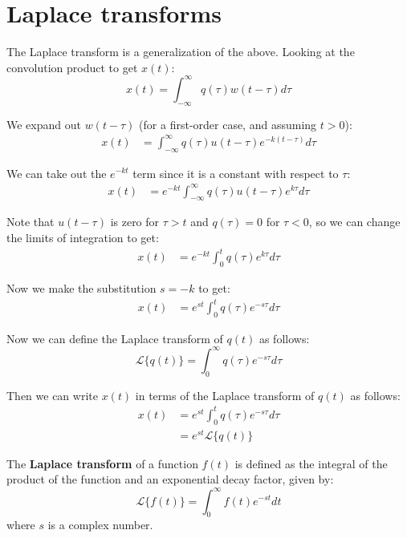 \section{Laplace transforms}
The Laplace transform is a generalization of the above. Looking at the convolution product to get $x(t)$:
\begin{equation*}
x(t) = \int_{-\infty}^{\infty} q(\tau) w(t - \tau) d\tau
\end{equation*}

We expand out $w(t - \tau)$ (for a first-order case, and assuming $t > 0$):
\begin{align*}
x(t) &= \int_{-\infty}^{\infty} q(\tau) u(t - \tau) e^{-k(t - \tau)} d\tau 
\end{align*}

We can take out the $e^{-kt}$ term since it is a constant with respect to $\tau$:
\begin{align*}
x(t) &= e^{-kt} \int_{-\infty}^{\infty} q(\tau) u(t - \tau) e^{k\tau} d\tau
\end{align*}

Note that $u(t - \tau)$ is zero for $\tau > t$ and $q(\tau) = 0$ for $\tau < 0$, so we can change the limits of integration to get:
\begin{align*}
x(t) &= e^{-kt} \int_{0}^{t} q(\tau) e^{k\tau} d\tau
\end{align*}

Now we make the substitution $s = -k$ to get:
\begin{align*}
x(t) &= e^{st} \int_{0}^{t} q(\tau) e^{-s\tau} d\tau
\end{align*}

Now we can define the Laplace transform of $q(t)$ as follows:
\begin{equation*}
\boxed{
\mathcal{L}\{q(t)\} = \int_{0}^{\infty} q(\tau) e^{-s\tau} d\tau
}
\end{equation*}

Then we can write $x(t)$ in terms of the Laplace transform of $q(t)$ as follows:
\begin{align*}
x(t) &= e^{st} \int_{0}^{t} q(\tau)
e^{-s\tau} d\tau \\
&= e^{st} \mathcal{L}\{q(t)\}
\end{align*}

{
    The \textbf{Laplace transform} of a function $f(t)$ is defined as the integral of the product of the function and an exponential decay factor, given by:
    \[
    \mathcal{L}\{f(t)\} = \int_{0}^{\infty} f(t) e^{-st} dt
    \]
    where $s$ is a complex number. 
}

